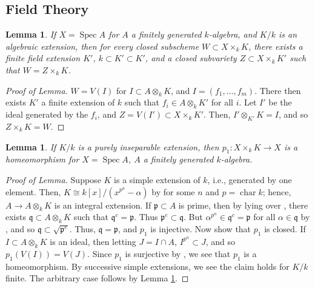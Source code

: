 \documentclass[10pt]{article}
\newtheorem{lemma}[subsubsection]{Lemma}
\theoremstyle{definition}
\theoremstyle{remark}
\numberwithin{equation}{section}
\numberwithin{figure}{subsubsection}
\DeclareMathOperator{\Spec}{Spec}
\DeclareMathOperator{\Char}{char}
\begin{document}
\subsection{Field Theory}
\begin{lemma}\label{finext}
  If $X = \Spec A$ for $A$ a finitely generated $k$-algebra, and $K/k$ is an algebraic extension, then for every closed subscheme $W \subset X \times_k K$, there exists a finite field extension $K'$, $k \subset K' \subset K'$, and a closed subvariety $Z \subset X \times_k K'$ such that $W = Z \times_k K$.
\end{lemma}
\begin{proof}[Proof of Lemma]
  $W = V(I)$ for $I \subset A \otimes_k K$, and $I = (f_1,\ldots,f_m)$. There then exists $K'$ a finite extension of $k$ such that $f_i \in A \otimes_k K'$ for all $i$. Let $I'$ be the ideal generated by the $f_i$, and $Z = V(I') \subset X \times_k K'$. Then, $I' \otimes_{K'} K = I$, and so $Z \times_k K = W$.
\end{proof}
\begin{lemma}\label{purinsep}
  If $K/k$ is a purely inseparable extension, then $p_1\colon X \times_k K \to X$ is a homeomorphism for $X = \Spec A$, $A$ a finitely generated $k$-algebra.
\end{lemma}
\begin{proof}[Proof of Lemma]
  Suppose $K$ is a simple extension of $k$, i.e., generated by one element.
  Then, $K \cong k[x]/(x^{p^n}-\alpha)$ by \cite[Thm.~19.10]{Isa09} for some $n$
  and $p = \Char k$; hence, $A \to A \otimes_k K$ is an integral extension. If
  $\mathfrak{p} \subset A$ is prime, then by lying over \cite[Thm.~5.10]{AM69},
  there exists $\mathfrak{q} \subset A \otimes_k K$ such that $\mathfrak{q}^c =
  \mathfrak{p}$. Thus $\mathfrak{p}^e \subset \mathfrak{q}$. But $\alpha^{p^n}
  \in \mathfrak{q}^c = \mathfrak{p}$ for all $\alpha \in \mathfrak{q}$ by
  \cite[Thm.~19.10]{Isa09}, and so $\mathfrak{q} \subset \sqrt{\mathfrak{p}^e}$.
  Thus, $\mathfrak{q} = \mathfrak{p}$, and $p_1$ is injective. Now show that
  $p_1$ is closed. If $I \subset A \otimes_k K$ is an ideal, then letting $J = I
  \cap A$, $I^{p^n} \subset J$, and so $p_1(V(I)) = V(J)$. Since $p_1$ is
  surjective by \cite[Exc.\ 5.10]{AM69}, we see that $p_1$ is a homeomorphism. By successive simple extensions, we see the claim holds for $K/k$ finite. The arbitrary case follows by Lemma \ref{finext}.
\end{proof}
\end{document}
